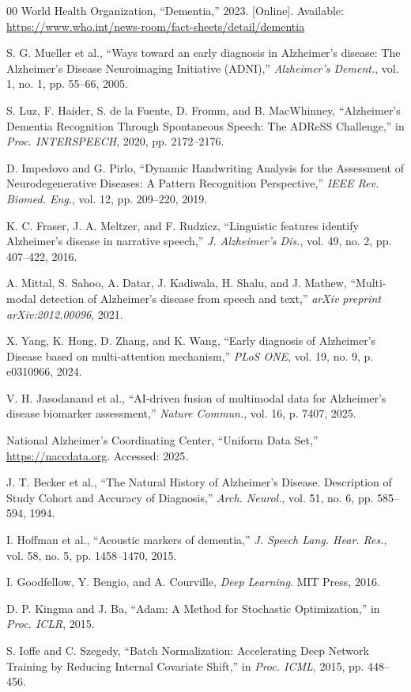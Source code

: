 \documentclass[conference]{IEEEtran}
\begin{document}
\begin{thebibliography}{00}
World Health Organization, ``Dementia,'' 2023. [Online]. Available: \url{https://www.who.int/news-room/fact-sheets/detail/dementia}

S. G. Mueller et al., ``Ways toward an early diagnosis in Alzheimer’s disease: The Alzheimer’s Disease Neuroimaging Initiative (ADNI),'' \emph{Alzheimer's Dement.}, vol. 1, no. 1, pp. 55--66, 2005.

S. Luz, F. Haider, S. de la Fuente, D. Fromm, and B. MacWhinney, ``Alzheimer's Dementia Recognition Through Spontaneous Speech: The ADReSS Challenge,'' in \emph{Proc. INTERSPEECH}, 2020, pp. 2172--2176.

D. Impedovo and G. Pirlo, ``Dynamic Handwriting Analysis for the Assessment of Neurodegenerative Diseases: A Pattern Recognition Perspective,'' \emph{IEEE Rev. Biomed. Eng.}, vol. 12, pp. 209--220, 2019.

K. C. Fraser, J. A. Meltzer, and F. Rudzicz, ``Linguistic features identify Alzheimer's disease in narrative speech,'' \emph{J. Alzheimer's Dis.}, vol. 49, no. 2, pp. 407--422, 2016.

A. Mittal, S. Sahoo, A. Datar, J. Kadiwala, H. Shalu, and J. Mathew, ``Multi-modal detection of Alzheimer's disease from speech and text,'' \emph{arXiv preprint arXiv:2012.00096}, 2021.

X. Yang, K. Hong, D. Zhang, and K. Wang, ``Early diagnosis of Alzheimer's Disease based on multi‑attention mechanism,'' \emph{PLoS ONE}, vol. 19, no. 9, p. e0310966, 2024.

V. H. Jasodanand et al., ``AI‑driven fusion of multimodal data for Alzheimer's disease biomarker assessment,'' \emph{Nature Commun.}, vol. 16, p. 7407, 2025.

National Alzheimer’s Coordinating Center, ``Uniform Data Set,'' \url{https://naccdata.org}. Accessed: 2025.

J. T. Becker et al., ``The Natural History of Alzheimer's Disease. Description of Study Cohort and Accuracy of Diagnosis,'' \emph{Arch. Neurol.}, vol. 51, no. 6, pp. 585--594, 1994.

I. Hoffman et al., ``Acoustic markers of dementia,'' \emph{J. Speech Lang. Hear. Res.}, vol. 58, no. 5, pp. 1458--1470, 2015.

I. Goodfellow, Y. Bengio, and A. Courville, \emph{Deep Learning}. MIT Press, 2016.

D. P. Kingma and J. Ba, ``Adam: A Method for Stochastic Optimization,'' in \emph{Proc. ICLR}, 2015.

S. Ioffe and C. Szegedy, ``Batch Normalization: Accelerating Deep Network Training by Reducing Internal Covariate Shift,'' in \emph{Proc. ICML}, 2015, pp. 448--456.
\end{thebibliography}
\end{document}
